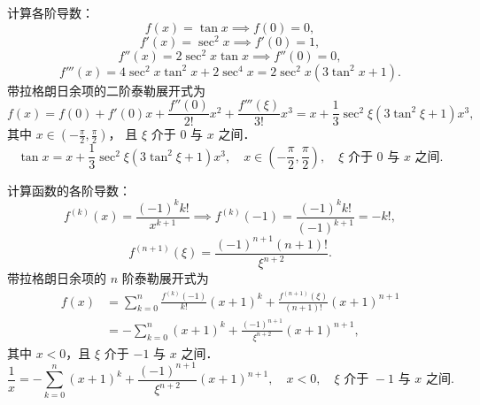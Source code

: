 \begin{solution}

    计算各阶导数：
    \begin{equation}
        f(x) = \tan x \implies f(0) = 0,
    \end{equation}
    \begin{equation}
        f'(x) = \sec^2 x \implies f'(0) = 1,
    \end{equation}
    \begin{equation}
        f''(x) = 2\sec^2 x \tan x \implies f''(0) = 0,
    \end{equation}
    \begin{equation}
        f'''(x) = 4\sec^2 x \tan^2 x + 2\sec^4 x = 2\sec^2 x (3\tan^2 x + 1).
    \end{equation}
    带拉格朗日余项的二阶泰勒展开式为
    \begin{equation}
        f(x) = f(0) + f'(0)x + \frac{f''(0)}{2!}x^2 + \frac{f'''(\xi)}{3!}x^3 = x + \frac{1}{3}\sec^2 \xi (3\tan^2 \xi + 1)x^3,
    \end{equation}
    其中 $x \in \left(-\frac{\pi}{2},\frac{\pi}{2}\right)$，
    且 $\xi$ 介于 $0$ 与 $x$ 之间．
    \begin{equation}
        \boxed{
            \tan x = x + \frac{1}{3}\sec^2 \xi (3\tan^2 \xi + 1)x^3,
            \quad
            x \in \left(-\frac{\pi}{2},\frac{\pi}{2}\right),
            \quad
            \xi \text{ 介于 } 0 \text{ 与 } x \text{ 之间}.
        }
    \end{equation}


    计算函数的各阶导数：
    \begin{equation}
        f^{(k)}(x) = \frac{(-1)^k k!}{x^{k+1}} \implies f^{(k)}(-1) = \frac{(-1)^k k!}{(-1)^{k+1}} = -k!,
    \end{equation}
    \begin{equation}
        f^{(n+1)}(\xi) = \frac{(-1)^{n+1}(n+1)!}{\xi^{n+2}}.
    \end{equation}
    带拉格朗日余项的 $n$ 阶泰勒展开式为
    \begin{equation}
        \begin{aligned}
            f(x) & = \sum_{k=0}^n \frac{f^{(k)}(-1)}{k!}(x + 1)^k + \frac{f^{(n+1)}(\xi)}{(n+1)!}(x + 1)^{n+1} \\
                 & = -\sum_{k=0}^n (x + 1)^k + \frac{(-1)^{n+1}}{\xi^{n+2}}(x + 1)^{n+1},
        \end{aligned}
    \end{equation}
    其中 $x<0$，且 $\xi$ 介于 $-1$ 与 $x$ 之间．
    \begin{equation}
        \boxed{
            \frac{1}{x}
            =
            -\sum_{k=0}^n (x+1)^k
            +
            \frac{(-1)^{n+1}}{\xi^{n+2}}(x+1)^{n+1},
            \quad
            x<0,
            \quad
            \xi \text{ 介于 } -1 \text{ 与 } x \text{ 之间}.
        }
    \end{equation}
\end{solution}

